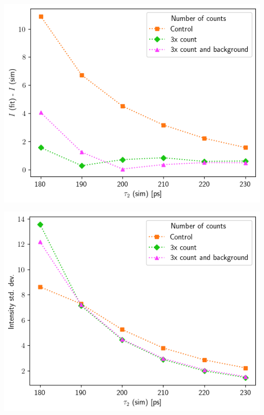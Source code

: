 {\begin{minipage}{ .47\linewidth}
    \includegraphics[width=\linewidth]{Batch 5/2080-diff i1.png}
    \label{fig:compcount-I-2080}
\end{minipage}
\hfill
\begin{minipage}{ .47\linewidth}
    \includegraphics[width=\linewidth]{Batch 5/2080-err i1.png}
    \label{fig:compcount-Ierr-2080}
\end{minipage}
\begin{minipage}{ .47\linewidth}

\end{minipage}}
